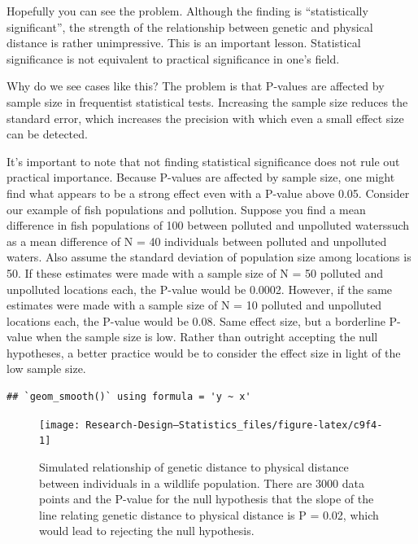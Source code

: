 \documentclass[
]{book}
\begin{document}
Hopefully you can see the problem. Although the finding is ``statistically significant'', the strength of the relationship between genetic and physical distance is rather unimpressive. This is an important lesson. Statistical significance is not equivalent to practical significance in one's field.

Why do we see cases like this? The problem is that P-values are affected by sample size in frequentist statistical tests. Increasing the sample size reduces the standard error, which increases the precision with which even a small effect size can be detected.

It's important to note that not finding statistical significance does not rule out practical importance. Because P-values are affected by sample size, one might find what appears to be a strong effect even with a P-value above 0.05. Consider our example of fish populations and pollution. Suppose you find a mean difference in fish populations of 100 between polluted and unpolluted waterssuch as a mean difference of N = 40 individuals between polluted and unpolluted waters. Also assume the standard deviation of population size among locations is 50. If these estimates were made with a sample size of N = 50 polluted and unpolluted locations each, the P-value would be 0.0002. However, if the same estimates were made with a sample size of N = 10 polluted and unpolluted locations each, the P-value would be 0.08. Same effect size, but a borderline P-value when the sample size is low. Rather than outright accepting the null hypotheses, a better practice would be to consider the effect size in light of the low sample size.

\begin{verbatim}
## `geom_smooth()` using formula = 'y ~ x'
\end{verbatim}

\begin{figure}

{\centering \texttt{[image: Research-Design---Statistics\_files/figure-latex/c9f4-1]} 

}

\caption{Simulated relationship of genetic distance to physical distance between individuals in a wildlife population. There are 3000 data points and the P-value for the null hypothesis that the slope of the line relating genetic distance to physical distance is P = 0.02, which would lead to rejecting the null hypothesis.}\label{fig:c9f4}
\end{figure}
\end{document}
